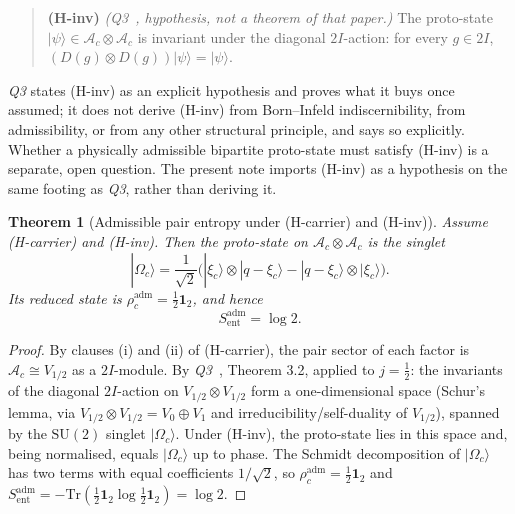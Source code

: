 \documentclass[11pt]{article}
\newtheorem{theorem}{Theorem}
\newcommand{\Sadm}{S_{\mathrm{ent}}^{\mathrm{adm}}}
\begin{document}
    \begin{quote}
      \textbf{(H-inv)} \emph{(Q3~\cite{Beau2026q3}, hypothesis, not a theorem of that paper.)}
      The proto-state $|\psi\rangle\in\mathcal{A}_c\otimes\mathcal{A}_c$ is invariant under the
      diagonal $2I$-action: for every $g\in 2I$, $(D(g)\otimes D(g))|\psi\rangle=|\psi\rangle$.
    \end{quote}

    \emph{Q3} states (H-inv) as an explicit hypothesis and proves what it buys once assumed; it
    does not derive (H-inv) from Born--Infeld indiscernibility, from admissibility, or from any
    other structural principle, and says so explicitly.
    Whether a physically admissible bipartite proto-state must satisfy (H-inv) is a separate,
    open question.
    The present note imports (H-inv) as a hypothesis on the same footing as \emph{Q3}, rather
    than deriving it.

    \begin{theorem}[Admissible pair entropy under (H-carrier) and (H-inv)]
      \label{thm:adm}
      Assume (H-carrier) and (H-inv).
      Then the proto-state on $\mathcal{A}_c\otimes\mathcal{A}_c$ is the singlet
      \[
        |\Omega_c\rangle
        = \frac{1}{\sqrt{2}}
        \bigl(|\xi_c\rangle\otimes|q-\xi_c\rangle
        - |q-\xi_c\rangle\otimes|\xi_c\rangle\bigr).
      \]
      Its reduced state is $\rho^{\mathrm{adm}}_c = \tfrac12\mathbf{1}_2$, and hence
      \[
        \Sadm = \log 2.
      \]
    \end{theorem}

    \begin{proof}
      By clauses (i) and (ii) of (H-carrier), the pair sector of each factor is
      $\mathcal{A}_c\cong V_{1/2}$ as a $2I$-module.
      By \emph{Q3}~\cite{Beau2026q3}, Theorem 3.2, applied to $j=\tfrac12$: the invariants of the
      diagonal $2I$-action on $V_{1/2}\otimes V_{1/2}$ form a one-dimensional space (Schur's
      lemma, via $V_{1/2}\otimes V_{1/2}=V_0\oplus V_1$ and irreducibility/self-duality of
      $V_{1/2}$), spanned by the $\mathrm{SU}(2)$ singlet $|\Omega_c\rangle$.
      Under (H-inv), the proto-state lies in this space and, being normalised, equals
      $|\Omega_c\rangle$ up to phase.
      The Schmidt decomposition of $|\Omega_c\rangle$ has two terms with equal coefficients
      $1/\sqrt 2$, so $\rho^{\mathrm{adm}}_c = \tfrac12\mathbf{1}_2$ and
      $\Sadm = -\mathrm{Tr}(\tfrac12\mathbf{1}_2\log\tfrac12\mathbf{1}_2) = \log 2$.
    \end{proof}
\end{document}

